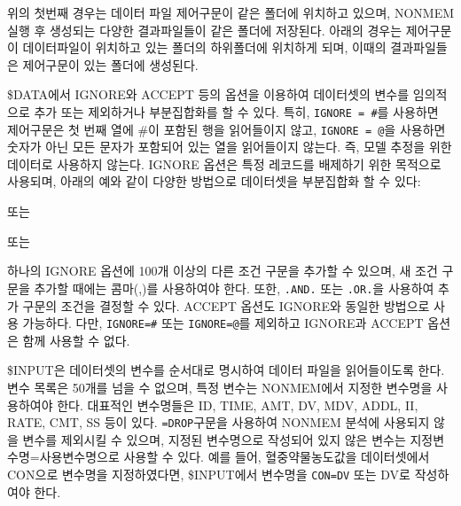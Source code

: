 \documentclass[
  11pt,
  krantz2,
  a4paper]{krantz}
\newenvironment{Shaded}{\begin{snugshade}}{\end{snugshade}}
\newcommand{\CommentTok}[1]{\textcolor[rgb]{0.56,0.35,0.01}{\textit{#1}}}
\newcommand{\NormalTok}[1]{#1}
\newcommand{\OperatorTok}[1]{\textcolor[rgb]{0.81,0.36,0.00}{\textbf{#1}}}
\newcommand{\StringTok}[1]{\textcolor[rgb]{0.31,0.60,0.02}{#1}}
\theoremstyle{definition}
\theoremstyle{definition}
\theoremstyle{definition}
\theoremstyle{remark}
\begin{document}
위의 첫번째 경우는 데이터 파일 제어구문이 같은 폴더에 위치하고 있으며, NONMEM 실행 후 생성되는 다양한 결과파일들이 같은 폴더에 저장된다. 아래의 경우는 제어구문이 데이터파일이 위치하고 있는 폴더의 하위폴더에 위치하게 되며, 이때의 결과파일들은 제어구문이 있는 폴더에 생성된다.

\$DATA에서 IGNORE와 ACCEPT 등의 옵션을 이용하여 데이터셋의 변수를 임의적으로 추가 또는 제외하거나 부분집합화를 할 수 있다. 특히, \texttt{IGNORE\ =\ \#}를 사용하면 제어구문은 첫 번째 열에 \#이 포함된 행을 읽어들이지 않고, \texttt{IGNORE\ =\ @}을 사용하면 숫자가 아닌 모든 문자가 포함되어 있는 열을 읽어들이지 않는다. 즉, 모델 추정을 위한 데이터로 사용하지 않는다. IGNORE 옵션은 특정 레코드를 배제하기 위한 목적으로 사용되며, 아래의 예와 같이 다양한 방법으로 데이터셋을 부분집합화 할 수 있다:

\begin{Shaded}
\end{Shaded}

또는

\begin{Shaded}
\end{Shaded}

또는

\begin{Shaded}
\end{Shaded}

하나의 IGNORE 옵션에 100개 이상의 다른 조건 구문을 추가할 수 있으며, 새 조건 구문을 추가할 때에는 콤마(,)를 사용하여야 한다. 또한, \texttt{.AND.} 또는 \texttt{.OR.}을 사용하여 추가 구문의 조건을 결정할 수 있다. ACCEPT 옵션도 IGNORE와 동일한 방법으로 사용 가능하다. 다만, \texttt{IGNORE=\#} 또는 \texttt{IGNORE=@}를 제외하고 IGNORE과 ACCEPT 옵션은 함께 사용할 수 없다.

\$INPUT은 데이터셋의 변수를 순서대로 명시하여 데이터 파일을 읽어들이도록 한다. 변수 목록은 50개를 넘을 수 없으며, 특정 변수는 NONMEM에서 지정한 변수명을 사용하여야 한다. 대표적인 변수명들은 ID, TIME, AMT, DV, MDV, ADDL, II, RATE, CMT, SS 등이 있다. \texttt{=DROP}구문을 사용하여 NONMEM 분석에 사용되지 않을 변수를 제외시킬 수 있으며, 지정된 변수명으로 작성되어 있지 않은 변수는 지정변수명=사용변수명으로 사용할 수 있다. 예를 들어, 혈중약물농도값을 데이터셋에서 CON으로 변수명을 지정하였다면, \$INPUT에서 변수명을 \texttt{CON=DV} 또는 DV로
작성하여야 한다.
\end{document}
